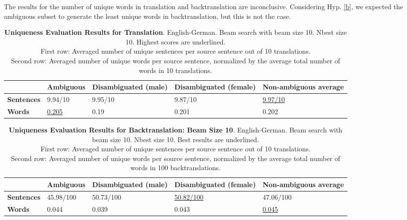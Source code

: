The results for the number of unique words in translation and backtranslation are inconclusive. Considering Hyp. \ref{b}, we expected the ambiguous subset to generate the least unique words in backtranslation, but this is not the case.

\begin{table} 
    \label{tab:uniqueness_translation}
    \begin{tabularx}{\linewidth}{|X|XXXX|}
        \hline
         & \textbf{Ambiguous} & \textbf{Disambiguated (male)} & \textbf{Disambiguated (female)} & \textbf{Non-ambiguous average} \\ \hline
         \textbf{Sentences} & 9.94/10 & 9.95/10 & 9.87/10 & \underline{9.97/10} \\ 
         \textbf{Words} & \underline{0.205} & 0.19 & 0.201 & 0.202 \\ \hline
    \end{tabularx}
    \caption{\textbf{Uniqueness Evaluation Results for Translation}. English-German. Beam search with beam size 10. Nbest size 10. Highest scores are underlined. \\ First row: Averaged number of unique sentences per source sentence out of 10 translations. \\ Second row: Averaged number of unique words per source sentence, normalized by the average total number of words in 10 translations.}
\end{table}

\begin{table} 
    \label{tab:uniqueness_backtranslation}
    \begin{tabularx}{\linewidth}{|X|XXXX|}
        \hline
         & \textbf{Ambiguous} & \textbf{Disambiguated (male)} & \textbf{Disambiguated (female)} & \textbf{Non-ambiguous average} \\ \hline
         \textbf{Sentences} & 45.98/100 & 50.73/100 & \underline{50.82/100} & 47.06/100 \\ 
         \textbf{Words} & 0.044 & 0.039 & 0.043 & \underline{0.045} \\ \hline
    \end{tabularx}
    \caption{\textbf{Uniqueness Evaluation Results for Backtranslation: Beam Size 10}. English-German. Beam search with beam size 10. Nbest size 10. Best results are underlined. \\ First row: Averaged number of unique sentences per source sentence out of 10 translations. \\ Second row: Averaged number of unique words per source sentence, normalized by the average total number of words in 100 backtranslations.}
\end{table}


